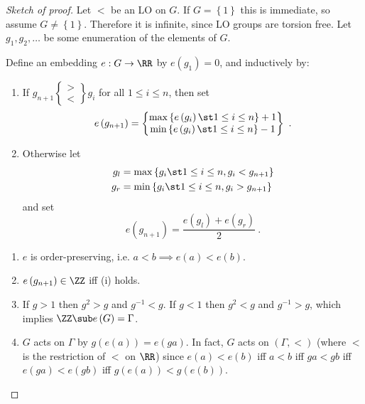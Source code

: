 \begin{proof}[Sketch of proof]
Let $<$ be an LO on $G$. If $G = \left\{1\right\}$ this is immediate, so assume $G\neq
\left\{1\right\}$. Therefore it is infinite, since LO groups are torsion free.
Let $g_1 , g_2 , \ldots$ be some enumeration of the elements of $G$.

Define an embedding $e : G\to \RR$ by
$e\left(g_1\right) = 0$, and inductively by:
\begin{enumerate}[label = (\iii)]
\item If $g_{n+1} 
\begin{Bmatrix}
> \\ <
\end{Bmatrix}
g_i$ for all $1\leq i\leq n$, then set
\begin{equation}
e\left(g_{n+1}\right) = 
\begin{Bmatrix}
\max \left\{e\left(g_i\right) \st 1\leq i\leq n\right\} + 1 \\
\min \left\{e\left(g_i\right) \st 1\leq i\leq n\right\} - 1 
\end{Bmatrix}
\ .
\end{equation}
\item Otherwise let
\begin{align*}
g_l &= \max\left\{ g_i \st 1\leq i\leq n , g_i < g_{n+1}\right\} \\
g_r &= \min\left\{g_i \st 1\leq i\leq n , g_i > g_{n+1}\right\}
\end{align*}
and set
\begin{equation*}
e\left(g_{n+1}\right) = 
\frac{e\left(g_l\right) + e\left(g_r\right)}{2} \ .
\end{equation*}
\end{enumerate}
\begin{rmk}
\begin{enumerate}
\item $e$ is order-preserving, i.e. $a< b\implies e\left(a\right) < e\left(b\right)$.
\item $e\left(g_{n+1}\right)\in \ZZ$ iff (i) holds.
\item If $g > 1$ then $g^2 > g$ and $g^{-1} < g$. 
If $g < 1$ then $g^2 < g$ and $g^{-1} > g$, which implies $\ZZ\sub e\left(G\right) =
\Gamma$.
\item $G$ acts on $\Gamma$ by 
$g\left(e\left(a\right)\right) = e\left(ga\right)$. 
In fact, $G$ acts on $\left(\Gamma  , <\right)$ (where $<$ is the restriction of $<$ on
$\RR$) since
$e\left(a\right) < e\left(b\right)$ iff $a<b$ iff $ga < gb$ iff
$e\left(ga\right) < e\left(gb\right)$ iff $g\left(e\left(a\right)\right) <
g\left(e\left(b\right)\right)$.
\end{enumerate}
\end{rmk}


\end{proof}
